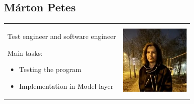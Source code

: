 \documentclass{article}
\begin{document}
\subsection{Márton Petes}
    \begin{tabular}{@{}p{}@{} p{}@{}}
    Test engineer and software engineer
    
    Main tasks:
    \begin{itemize}
        \item Testing the program
        \item Implementation in Model layer
    \end{itemize}
    &
    \includegraphics[width=\linewidth]{img/Marton_Petes.png}
    \end{tabular}
\end{document}
